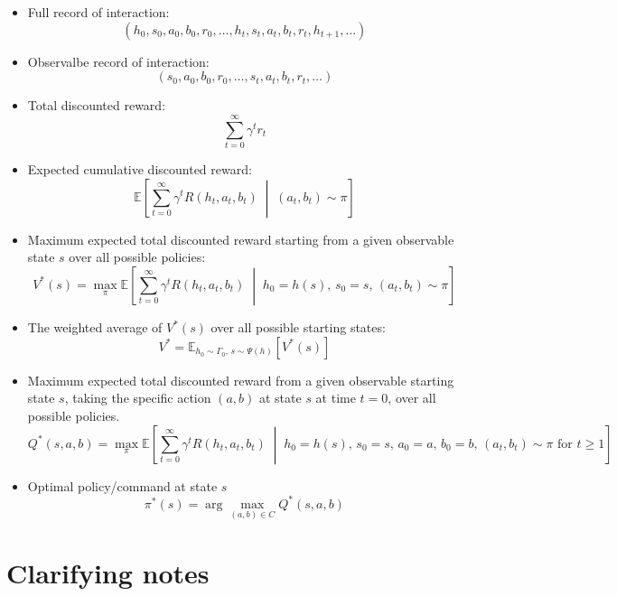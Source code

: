 \documentclass[11pt,a4paper]{article}
\begin{document}
\begin{itemize}[leftmargin=*, itemsep=0.5em]
    \item Full record of interaction:
    \[
    (h_{0}, s_{0}, a_{0}, b_{0}, r_{0}, \dots, h_{t}, s_{t}, a_{t}, b_{t}, r_{t}, h_{t+1}, \dots)
    \]

    \item Observalbe record of interaction:
    \[
    (s_{0}, a_{0}, b_{0}, r_{0}, \dots, s_{t}, a_{t}, b_{t}, r_{t}, \dots)
    \]

    \item Total discounted reward:
    \[
    \sum_{t=0}^\infty \gamma^t r_t
    \]

    \item Expected cumulative discounted reward:
    \[
    \mathbb{E} \left[ \sum_{t=0}^{\infty} \gamma^{t} R(h_{t}, a_{t}, b_{t}) \;\middle|\; (a_{t}, b_{t}) \sim \pi \right]
    \]

    \item Maximum expected total discounted reward starting from a given observable state $s$ over all possible policies:
    \[
    V^*(s) = \max_{\pi} \mathbb{E} \left[ \sum_{t=0}^{\infty} \gamma^{t} R(h_{t}, a_{t}, b_{t}) \;\middle|\; h_{0} = h(s),\, s_{0} = s,\, (a_{t}, b_{t}) \sim \pi \right]
    \]

    \item The weighted average of $V^*(s)$ over all possible starting states:
    \[
    V^* = \mathbb{E}_{h_0 \sim \Gamma_{0},\, s \sim \Psi(h)} \left[ V^*(s) \right]
    \]

    \item Maximum expected total discounted reward from a given observable starting state $s$, taking the specific action $(a,b)$ at state $s$ at time $t=0$, over all possible policies.
    \[
    Q^*(s, a, b) = \max_{\pi} \mathbb{E} \left[ \sum_{t=0}^{\infty} \gamma^{t} R(h_{t}, a_{t}, b_{t}) \;\middle|\; h_{0} = h(s),\, s_{0} = s,\, a_{0} = a,\, b_{0} = b,\, (a_{t}, b_{t}) \sim \pi \text{ for } t \ge 1 \right]
    \]

    \item Optimal policy/command at state $s$
    \[
    \pi^*(s) = \arg\max_{(a,b) \in C} Q^*(s, a, b)
    \]
\end{itemize}

\section*{Clarifying notes}
\end{document}
